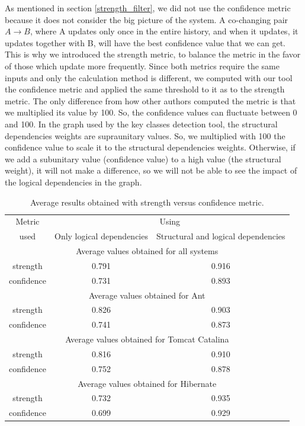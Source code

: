 \documentclass[runningheads]{comsis2}
\begin{document}
As mentioned in section \ref{strength_filter}, we did not use the confidence metric because it does not consider the big picture of the system.
A co-changing pair $A \rightarrow B$, where A updates only once in the entire history, and when it updates, it updates together with B, will have the best confidence value that we can get. This is why we introduced the strength metric, to balance the metric in the favor of those which update more frequently.
Since both metrics require the same inputs and only the calculation method is different, we computed with our tool the confidence metric and applied the same threshold to it as to the strength metric. The only difference from how other authors computed the metric is that we multiplied its value by 100. So, the confidence values can fluctuate between 0 and 100.
In the graph used by the key classes detection tool, the structural dependencies weights are supraunitary values. So, we multiplied with 100 the confidence value to scale it to the structural dependencies weights. Otherwise, if we add a subunitary value (confidence value) to a high value (the structural weight), it will not make a difference, so we will not be able to see the impact of the logical dependencies in the graph.

\begin{table}[!h]
\setlength\tabcolsep{3.5pt}
\caption{ Average results obtained with strength versus confidence metric.}
\label{tab:confidence_vs_strength}
\centering
\begin{tabular}{|c|c|c|}
\hline
Metric  &\multicolumn{2}{c|}{Using}\\
 used &Only logical dependencies 	&	Structural and logical dependencies 	 \\
\hline
\multicolumn{3}{|c|}{Average values obtained for all systems}\\
\hline
strength	&	0.791	&	0.916	\\
confidence	&	0.731	&	0.893	\\
\hline
\multicolumn{3}{|c|}{Average values obtained for Ant}\\
\hline
strength	&	0.826	&	0.903	\\
confidence	&	0.741	&	0.873	\\
\hline
\multicolumn{3}{|c|}{Average values obtained for Tomcat Catalina}\\
\hline
strength	&	0.816	&	0.910	\\
confidence	&	0.752	&	0.878	\\
\hline
\multicolumn{3}{|c|}{Average values obtained for Hibernate}\\
\hline
strength	&	0.732	&	0.935	\\
confidence	&	0.699	&	0.929	\\

\hline
\end{tabular}
\end{table}
\end{document}
